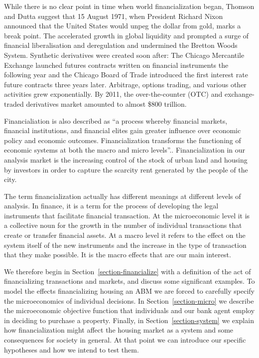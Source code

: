 While there is no clear point in time when world financialization began, Thomson and Dutta  suggest that  15 August 1971, when  President Richard Nixon announced that the United States would unpeg the dollar from gold, marks a break point.\cite{thomsonFinancialisationPrimer2018} The accelerated growth in global liquidity and prompted a surge of financial liberalisation and deregulation and undermined the Bretton Woods System.  Synthetic derivatives were created soon after: The Chicago Mercantile Exchange launched futures contracts written on financial instruments the following year and the Chicago Board of Trade introduced the first interest rate future contracts three years later. Arbitrage, options trading, and various other activities grew exponentially. By 2011, the over-the-counter (OTC) and exchange-traded derivatives market amounted to almost \$800 trillion.  %

Financialiation is also described as ``a process whereby financial markets, financial institutions, and financial elites gain greater influence over economic policy and economic outcomes. Financialization transforms the functioning of economic systems at both the macro and micro levels''.\cite{palleyFinancializationWhatIt2007}. Financialization in our analysis market is the increasing control of the stock of urban land and housing by investors in order to capture the scarcity rent generated by the people of the city.  



The term financialization actually has different meanings at different levels of analysis.  In finance, it is a term for the process of developing the legal instruments that facilitate financial transaction.  At the microeconomic level it is a collective noun for the growth in the number of individual transactions that create or transfer financial assets. At a macro level it refers to the effect on the system itself of the new instruments and the increase in the type of transaction that they make possible. It is the macro effects that are our main interest.

We therefore begin in Section~\ref{section-financialize}  with a definition of the act of financializing transactions and markets,  and discuss some significant examples. To model the effects  financializing housing   an \gls{ABM} we are forced to carefully specify the microeconomics of  individual decisions. In Section~\ref{section-micro} we describe the microeconomic objective function that individuals and our bank agent employ in deciding to purchase a property. Finally, in  Section~\ref{section-system} we explain how financialization might affect the housing market as a system and some consequences for society in general. At that point we can introduce our specific hypotheses and how we intend to test them.

